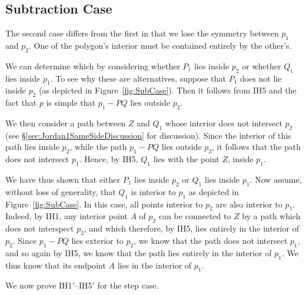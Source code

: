 \subsection{Subtraction Case}
The second case differs from the first in that we lose the symmetry between $p_1$ and $p_2$. One of the polygon's interior must be contained entirely by the other's.

We can determine which by considering whether $P_1$ lies inside $p_2$ or whether $Q_1$ lies inside $p_1$. To see why these are alternatives, suppose that $P_1$ does not lie inside $p_2$ (as depicted in Figure~\ref{fig:SubCase}). Then it follows from IH5 and the fact that $p$ is simple that $p_1 - PQ$ lies outside $p_2$. 

We then consider a path between $Z$ and $Q_1$ whose interior does not intersect $p_2$ (see \S\ref{sec:Jordan1SameSideDiscussion} for discussion). Since the interior of this path lies inside $p_2$, while the path $p_1 - PQ$ lies outside $p_2$, it follows that the path does not intersect $p_1$. Hence, by IH5, $Q_1$ lies with the point $Z$, inside $p_1$.

We have thus shown that either $P_1$ lies inside $p_2$ or $Q_1$ lies inside $p_1$. Now assume, without loss of generality, that $Q_1$ is interior to $p_1$ as depicted in Figure~\ref{fig:SubCase}. In this case, all points interior to $p_2$ are also interior to $p_1$. Indeed, by IH1, any interior point $A$ of $p_2$ can be connected to $Z$ by a path which does not interspect $p_2$, and which therefore, by IH5, lies entirely in the interior of $p_2$. Since $p_1 - PQ$ lies exterior to $p_2$, we know that the path does not intersect $p_1$, and so again by IH5, we know that the path lies entirely in the interior of $p_1$. We thus know that its endpoint $A$ lies in the interior of $p_1$.

We now prove IH1$'$--IH5$'$ for the step case.

